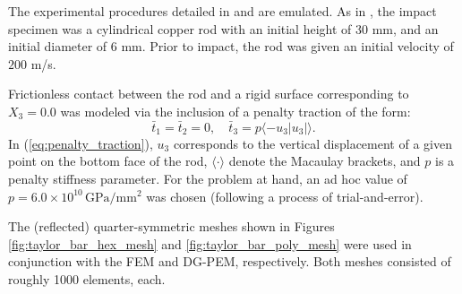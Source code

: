 The experimental procedures detailed in \cite{Johnson&Cook:83} and \cite{Gust:82} are emulated. As in \cite{Johnson&Cook:83}, the impact specimen was a cylindrical copper rod with an initial height of 30 mm, and an initial diameter of 6 mm. Prior to impact, the rod was given an initial velocity of $200$ m/s.

Frictionless contact between the rod and a rigid surface corresponding to $X_3 = 0.0$ was modeled via the inclusion of a penalty traction of the form:
\begin{equation}
	\bar{t}_1 = \bar{t}_2 = 0, \quad \bar{t}_3 = p \langle -u_3|u_3|  \rangle.
	\label{eq:penalty_traction}
\end{equation}
In (\ref{eq:penalty_traction}), $u_3$ corresponds to the vertical displacement of a given point on the bottom face of the rod, $\langle \cdot \rangle$ denote the Macaulay brackets, and $p$ is a penalty stiffness parameter. For the problem at hand, an ad hoc value of $p = 6.0 \times 10^{10} \, \text{GPa}/\text{mm}^2$ was chosen (following a process of trial-and-error).

The (reflected) quarter-symmetric meshes shown in Figures \ref{fig:taylor_bar_hex_mesh} and \ref{fig:taylor_bar_poly_mesh} were used in conjunction with the FEM and DG-PEM, respectively. Both meshes consisted of roughly 1000 elements, each.

